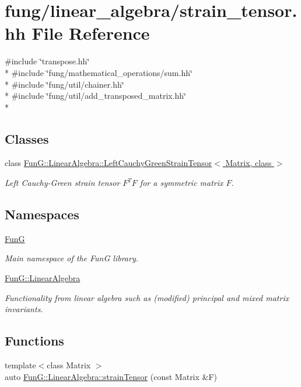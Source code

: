 \hypertarget{strain__tensor_8hh}{}\section{fung/linear\+\_\+algebra/strain\+\_\+tensor.hh File Reference}
\label{strain__tensor_8hh}
{\ttfamily \#include \char`\"{}transpose.\+hh\char`\"{}}\\*
{\ttfamily \#include \char`\"{}fung/mathematical\+\_\+operations/sum.\+hh\char`\"{}}\\*
{\ttfamily \#include \char`\"{}fung/util/chainer.\+hh\char`\"{}}\\*
{\ttfamily \#include \char`\"{}fung/util/add\+\_\+transposed\+\_\+matrix.\+hh\char`\"{}}\\*
\subsection*{Classes}
\begin{DoxyCompactItemize}
\item 
class \hyperlink{classFunG_1_1LinearAlgebra_1_1LeftCauchyGreenStrainTensor}{Fun\+G\+::\+Linear\+Algebra\+::\+Left\+Cauchy\+Green\+Strain\+Tensor$<$ Matrix, class $>$}
\begin{DoxyCompactList}\small\item\em Left Cauchy-\/\+Green strain tensor $ F^T F $ for a symmetric matrix $ F $. \end{DoxyCompactList}\end{DoxyCompactItemize}
\subsection*{Namespaces}
\begin{DoxyCompactItemize}
\item 
 \hyperlink{namespaceFunG}{Fun\+G}
\begin{DoxyCompactList}\small\item\em Main namespace of the Fun\+G library. \end{DoxyCompactList}\item 
 \hyperlink{namespaceFunG_1_1LinearAlgebra}{Fun\+G\+::\+Linear\+Algebra}
\begin{DoxyCompactList}\small\item\em Functionality from linear algebra such as (modified) principal and mixed matrix invariants. \end{DoxyCompactList}\end{DoxyCompactItemize}
\subsection*{Functions}
\begin{DoxyCompactItemize}
\item 
{\footnotesize template$<$class Matrix $>$ }\\auto \hyperlink{namespaceFunG_1_1LinearAlgebra_aca163950a2c0cb159fb83629b08337ba}{Fun\+G\+::\+Linear\+Algebra\+::strain\+Tensor} (const Matrix \&F)
\end{DoxyCompactItemize}

